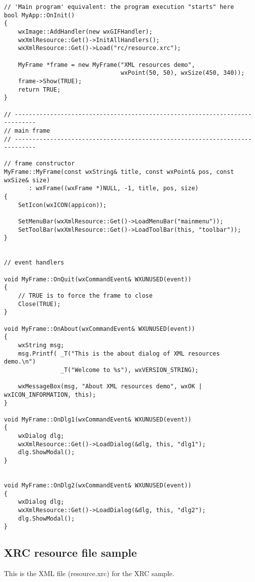 \begin{verbatim}
// 'Main program' equivalent: the program execution "starts" here
bool MyApp::OnInit()
{
    wxImage::AddHandler(new wxGIFHandler);
    wxXmlResource::Get()->InitAllHandlers();
    wxXmlResource::Get()->Load("rc/resource.xrc");

    MyFrame *frame = new MyFrame("XML resources demo",
                                 wxPoint(50, 50), wxSize(450, 340));
    frame->Show(TRUE);
    return TRUE;
}

// ----------------------------------------------------------------------------
// main frame
// ----------------------------------------------------------------------------

// frame constructor
MyFrame::MyFrame(const wxString& title, const wxPoint& pos, const wxSize& size)
       : wxFrame((wxFrame *)NULL, -1, title, pos, size)
{
    SetIcon(wxICON(appicon));

    SetMenuBar(wxXmlResource::Get()->LoadMenuBar("mainmenu"));
    SetToolBar(wxXmlResource::Get()->LoadToolBar(this, "toolbar"));
}


// event handlers

void MyFrame::OnQuit(wxCommandEvent& WXUNUSED(event))
{
    // TRUE is to force the frame to close
    Close(TRUE);
}

void MyFrame::OnAbout(wxCommandEvent& WXUNUSED(event))
{
    wxString msg;
    msg.Printf( _T("This is the about dialog of XML resources demo.\n")
                _T("Welcome to %s"), wxVERSION_STRING);

    wxMessageBox(msg, "About XML resources demo", wxOK | wxICON_INFORMATION, this);
}

void MyFrame::OnDlg1(wxCommandEvent& WXUNUSED(event))
{
    wxDialog dlg;
    wxXmlResource::Get()->LoadDialog(&dlg, this, "dlg1");
    dlg.ShowModal();
}


void MyFrame::OnDlg2(wxCommandEvent& WXUNUSED(event))
{
    wxDialog dlg;
    wxXmlResource::Get()->LoadDialog(&dlg, this, "dlg2");
    dlg.ShowModal();
}
\end{verbatim}

\subsection{XRC resource file sample}\label{xrcsample}

This is the XML file (resource.xrc) for the XRC sample.

